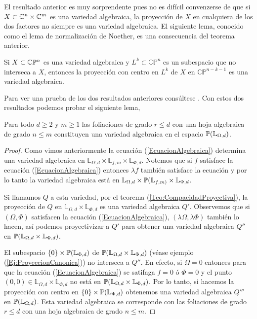 El resultado anterior es muy sorprendente pues no es difícil convenzerse de que si $X\subset\mathbb{C}^{n}\times\mathbb{C}^{m}$ es una variedad algebraica, la proyección de $X$ en cualquiera de los dos factores no siempre es una variedad algebraica. El siguiente lema, conocido como el lema de normalización de Noether, es una consecuencia del teorema anterior.

\begin{Lema}
\label{Lema:NormalizacionDeNoether}
Si $X\subset\mathbb{C}\mathbb{P}^{n}$ es una variedad algebraica y $L^{k}\subset\mathbb{CP}^{n  }$ es un subespacio que no interseca a $X$, entonces la proyección con centro en $L^{k}$ de $X$ en $\mathbb{CP}^{n-k-1}$ es una variedad algebraica. 
\end{Lema}

Para ver una prueba de los dos resultados anteriores consúltese \cite{Mumford}. Con estos dos resultados podemos probar el siguiente lema,

\begin{Lema}
\label{Lema:ConjuntoAlgebraico}
Para todo $d\geq 2$ y $m\geq 1$ las foliaciones de grado $r\leq d$ con una hoja algebraica de grado $n\leq m$ constituyen una variedad algebraica en el espacio $\mathbb{P}(\mathbb{L}_{\Omega,d})$.
\end{Lema}

\begin{proof}
Como vimos anteriormente la ecuación (\ref{EcuacionAlgebraica}) determina una variedad algebraica en $\mathbb{L}_{\Omega,d}\times\mathbb{L}_{f,m}\times\mathbb{L}_{\Phi,d}$. Notemos que si $f$ satisface la ecuación (\ref{EcuacionAlgebraica}) entonces $\lambda f$ también satisface la ecuación y por lo tanto la variedad algebraica está en $\mathbb{L}_{\Omega,d}\times\mathbb{P}(\mathbb{L}_{f,m)}\times\mathbb{L}_{\Phi,d}$.

 Si llamamos $Q$ a esta variedad, por el teorema (\ref{Teo:CompacidadProyectiva}), la proyección de $Q$ en $\mathbb{L}_{\Omega,d}\times\mathbb{L}_{\Phi,d}$ es una variedad algebraica $Q'$. Observemos que si $(\Omega,\Phi)$ satisfacen la ecuación (\ref{EcuacionAlgebraica}), $(\lambda\Omega,\lambda\Phi)$ también lo hacen, así podemos proyectivizar a $Q'$ para obtener una variedad algebraica $Q''$ en $\mathbb{P}(\mathbb{L}_{\Omega,d}\times\mathbb{L}_{\Phi,d})$.

El subespacio $\{0\}\times\mathbb{P}(\mathbb{L}_{\Phi,d})$ de $\mathbb{P}(\mathbb{L}_{\Omega,d}\times\mathbb{L}_{\Phi,d})$ (véase ejemplo (\ref{Ej:ProyeccionCanonica})) no interseca a $Q''$. En efecto, si $\Omega=0$ entonces para que la ecuación (\ref{EcuacionAlgebraica}) se satifaga $f=0$ ó $\Phi=0$ y el punto $(0,0)\in\mathbb{L}_{\Omega,d}\times\mathbb{L}_{\Phi,d}$ no está en $\mathbb{P}(\mathbb{L}_{\Omega,d}\times\mathbb{L}_{\Phi,d})$. Por lo tanto, si hacemos la proyección con centro en $\{0\}\times\mathbb{P}(\mathbb{L}_{\Phi,d})$ obtenemos una variedad algebraica $Q'''$ en $\mathbb{P}(\mathbb{L}_{\Omega,d})$. Esta variedad algebraica se corresponde con las foliaciones de grado $r\leq d$ con una hoja algebraica de grado $n\leq m$.  
\end{proof}

